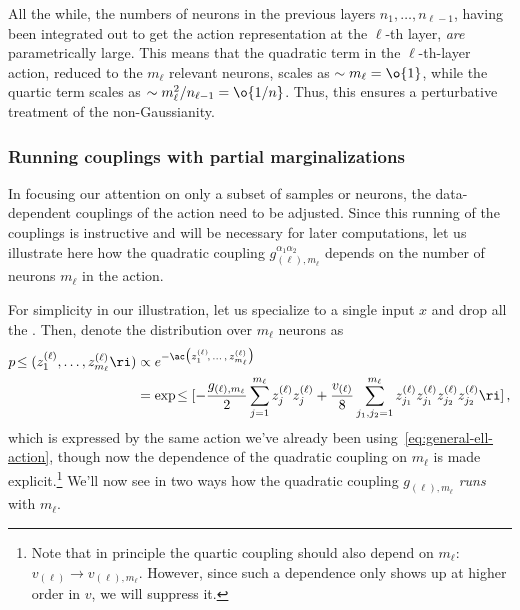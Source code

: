  All the while, the numbers of neurons in the previous layers $n_{1},\ldots,n_{\ell-1}$, having been integrated out to get the action representation at the $\ell$-th layer, \emph{are} parametrically large.
 This means that the quadratic term in the $\ell$-th-layer action, reduced to the $m_{\ell}$ relevant neurons, scales as $\sim m_{\ell}=\o{1}$, while the quartic term scales as $\sim m_{\ell}^2/n_{\ell-1}=\o{1/n}$. Thus, this ensures a perturbative treatment of the non-Gaussianity.





\subsubsection{Running couplings with partial marginalizations}
In focusing our attention on only a subset of samples or neurons, the data-dependent couplings of the action need to be adjusted. Since this running of the couplings is instructive and will be necessary for later computations, let us illustrate here how the quadratic coupling $g_{(\ell),m_{\ell}}^{\alpha_1\alpha_2}$ depends on the number of neurons $m_{\ell}$ in the action.

For simplicity in our illustration, let us specialize to a single input $x$ and drop all the . Then, denote the distribution over $m_{\ell}$ neurons as 
\begin{align}\label{eq:m-neuron-action}
p\!\le(z_1^{(\ell)},\ldots, z_{m_{\ell}}^{(\ell)}\ri)&\propto e^{-\ac\big(z_1^{(\ell)}\!,\,\ldots\,, \, z_{m_{\ell}}^{(\ell)}\big)}\, \\
&=\exp\!\le[-\frac{g_{(\ell),m_{\ell}}}{2}\sum_{j=1}^{m_{\ell}}z_{j}^{(\ell)}z_{j}^{(\ell)}+\frac{v_{(\ell)}}{8}\sum_{j_1,j_2=1}^{m_{\ell}}z_{j_1}^{(\ell)}z_{j_1}^{(\ell)}z_{j_2}^{(\ell)}z_{j_2}^{(\ell)}\ri]\, ,\notag
\end{align}
which is expressed by the same action we've already been using~\eqref{eq:general-ell-action}, though now the dependence of the quadratic coupling on $m_{\ell}$ is made explicit.\footnote{Note that in principle the quartic coupling should also depend on $m_{\ell}$: $v_{(\ell)} \to v_{(\ell),m_{\ell}}$. However, since such a dependence only shows up at higher order in $v$, we will suppress it.}
We'll now see in two ways how the quadratic coupling $g_{(\ell),m_{\ell}}$ \emph{runs} with $m_{\ell}$.

